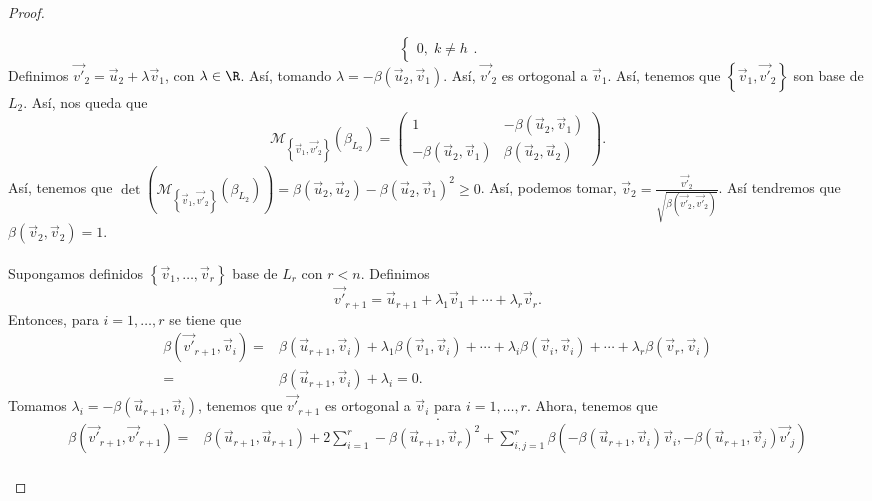 \begin{proof}
\begin{description}
\[\begin{cases}
	0, \; k \neq h
	\end{cases}
	.\]
	Definimos $\displaystyle \vec{v'}_{2} = \vec{u}_{2} + \lambda\vec{v}_{1} $, con $\displaystyle \lambda \in \R $. Así, tomando $\displaystyle \lambda = - \beta\left(\vec{u}_{2},\vec{v}_{1}\right) $. Así, $\displaystyle \vec{v'}_{2} $ es ortogonal a $\displaystyle \vec{v}_{1} $. Así, tenemos que $\displaystyle \left\{ \vec{v}_{1}, \vec{v'}_{2}\right\}  $ son base de $\displaystyle L_{2} $. Así, nos queda que
	\[\mathcal{M}_{ \left\{ \vec{v}_{1}, \vec{v'}_{2}\right\} }\left(\beta_{L_{2}}\right) = \begin{pmatrix} 1 & -\beta\left(\vec{u}_{2}, \vec{v}_{1}\right) \\
	-\beta\left(\vec{u}_{2}, \vec{v}_{1}\right) & \beta\left(\vec{u}_{2}, \vec{u}_{2}\right)\end{pmatrix} .\]
	Así, tenemos que $\displaystyle \det\left(\mathcal{M}_{ \left\{ \vec{v}_{1}, \vec{v'}_{2}\right\} }\left(\beta_{L_{2}}\right)\right) = \beta\left(\vec{u}_{2},\vec{u}_{2}\right)-\beta\left(\vec{u}_{2}, \vec{v}_{1}\right)^{2} \geq 0 $. Así, podemos tomar, $\displaystyle \vec{v}_{2} = \frac{\vec{v'}_{2}}{\sqrt{\beta\left(\vec{v'}_{2}, \vec{v'}_{2}\right)}} $. Así tendremos que $\displaystyle \beta\left(\vec{v}_{2}, \vec{v}_{2}\right) = 1 $. \\ \\
	Supongamos definidos $\displaystyle \left\{ \vec{v}_{1}, \ldots, \vec{v}_{r}\right\}  $ base de $\displaystyle L_{r} $ con $\displaystyle r < n $. Definimos 
	\[\vec{v'}_{r+1} = \vec{u}_{r+1}+ \lambda_{1}\vec{v}_{1} + \cdots + \lambda_{r}\vec{v}_{r}.\]
	Entonces, para $\displaystyle i = 1, \ldots, r $ se tiene que
	\[
	\begin{split}
		\beta\left(\vec{v'}_{r+1}, \vec{v}_{i}\right) = & \beta\left(\vec{u}_{r+1}, \vec{v}_{i}\right) + \lambda_{1}\beta\left(\vec{v}_{1}, \vec{v}_{i}\right) + \cdots + \lambda_{i}\beta\left(\vec{v}_{i}, \vec{v}_{i}\right) + \cdots + \lambda_{r}\beta\left(\vec{v}_{r}, \vec{v}_{i}\right)\\
		= & \beta\left(\vec{u}_{r+1}, \vec{v}_{i}\right) + \lambda_{i} = 0 .
	\end{split}
	\]
	Tomamos $\displaystyle \lambda_{i} = -\beta\left(\vec{u}_{r+1}, \vec{v}_{i}\right) $, tenemos que $\displaystyle \vec{v'}_{r+1} $ es ortogonal a $\displaystyle \vec{v}_{i} $ para $\displaystyle i = 1, \ldots, r $. Ahora, tenemos que
	\[ .\]
\[
\begin{split}
	\beta\left(\vec{v'}_{r+1}, \vec{v'}_{r+1}\right) = & \beta\left(\vec{u}_{r+1}, \vec{u}_{r+1}\right) + 2 \sum^{r}_{i=1}-\beta\left(\vec{u}_{r+1}, \vec{v}_{r}\right)^{2}+\sum^{r}_{i,j=1}\beta\left(-\beta\left(\vec{u}_{r+1}, \vec{v}_{i}\right)\vec{v}_{i},- \beta\left(\vec{u}_{r+1}, \vec{v}_{j}\right)\vec{v'}_{j}\right)\\

\end{split}\]
\end{description}
\end{proof}
